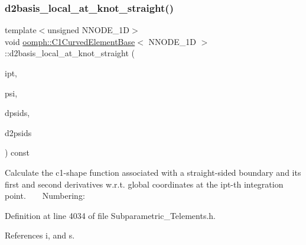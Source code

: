\subsubsection{\texorpdfstring{d2basis\+\_\+local\+\_\+at\+\_\+knot\+\_\+straight()}{d2basis\_local\_at\_knot\_straight()}}
{\footnotesize\ttfamily template$<$unsigned N\+N\+O\+D\+E\+\_\+1D$>$ \\
void \hyperlink{classoomph_1_1C1CurvedElementBase}{oomph\+::\+C1\+Curved\+Element\+Base}$<$ N\+N\+O\+D\+E\+\_\+1D $>$\+::d2basis\+\_\+local\+\_\+at\+\_\+knot\+\_\+straight (\begin{DoxyParamCaption}\item[{const unsigned \&}]{ipt,  }\item[{\hyperlink{classoomph_1_1Shape}{Shape} \&}]{psi,  }\item[{\hyperlink{classoomph_1_1DShape}{D\+Shape} \&}]{dpsids,  }\item[{\hyperlink{classoomph_1_1DShape}{D\+Shape} \&}]{d2psids }\end{DoxyParamCaption}) const\hspace{0.3cm}{\ttfamily [inline]}}

Calculate the c1-\/shape function associated with a straight-\/sided boundary and its first and second derivatives w.\+r.\+t. global coordinates at the ipt-\/th integration point. ~\newline
~\newline
 Numbering\+: 

Definition at line 4034 of file Subparametric\+\_\+\+Telements.\+h.



References i, and s.

\mbox{\label{classoomph_1_1C1CurvedElementBase_a7bcb3462fd699a3b3f6a8336ec8ed62e}} 
